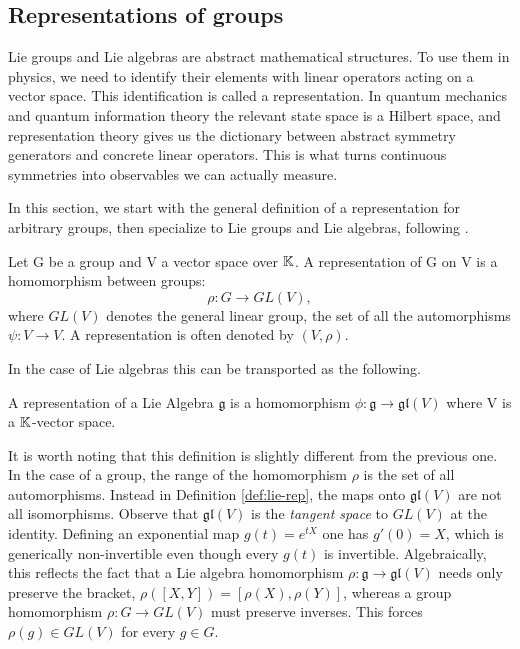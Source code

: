 \subsection*{Representations of groups}
Lie groups and Lie algebras are abstract mathematical structures. To use them in physics, we need to identify their elements with linear operators acting on a vector space. This identification is called a representation. In quantum mechanics and quantum information theory the relevant state space is a Hilbert space, and representation theory gives us the dictionary between abstract symmetry generators and concrete linear operators. This is what turns continuous symmetries into observables we can actually measure. 

In this section, we start with the general definition of a representation for arbitrary groups, then specialize to Lie groups and Lie algebras, following \cite{hallLieGroupsLie2003}.

\begin{definition}\label{def:group-rep}
	Let G be a group and V a vector space over $\mathbb{K}$. A representation of G on V is a homomorphism between groups:
	\[
		\rho : G \to GL(V),
	\]
	where $GL(V)$ denotes the general linear group, the set of all the automorphisms $\psi: V \to V$. A representation is often denoted by $(V, \rho)$.
\end{definition}


\noindent In the case of Lie algebras this can be transported as the following.

\begin{definition}\label{def:lie-rep}
	A representation of a Lie Algebra $\mathfrak{g}$ is a homomorphism $\phi: \mathfrak{g} \to \mathfrak{gl}(V)$ where V is a $\mathbb{K}$-vector space.
\end{definition}

\begin{remark}
	It is worth noting that this definition is slightly different from the previous one. In the case of a group, the range of the homomorphism $\rho$ is the set of all automorphisms. Instead in Definition \ref{def:lie-rep}, the maps onto $\mathfrak{gl}(V)$ are not all isomorphisms. Observe that $\mathfrak{gl}(V)$ is the \emph{tangent space} to $GL(V)$ at the identity.  Defining an exponential map $g(t) = e^{tX}$ one has $g'(0) = X$, which is generically non-invertible even though every $g(t)$ is invertible. Algebraically, this reflects the fact that a Lie algebra homomorphism $\rho : \mathfrak{g} \to \mathfrak{gl}(V)$ needs only preserve the bracket, $\rho([X,Y]) = [\rho(X),\rho(Y)]$, whereas a group homomorphism $\rho : G \to GL(V)$ must preserve inverses. This forces $\rho(g) \in GL(V)$ for every $g \in G$.
\end{remark}

